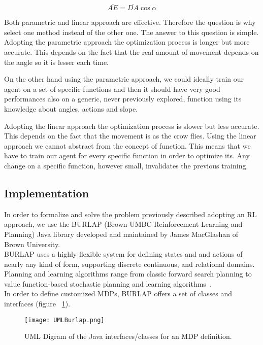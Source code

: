 \begin{equation}
	\overline{AE} = \overline{DA} \cos \alpha
\end{equation}

Both parametric and linear approach are effective. Therefore the question is why select one method instead of the other one. The answer to this question is simple. Adopting the parametric approach the optimization process is longer but more accurate. This depends on the fact that the real amount of movement depends on the angle so it is lesser each time. 

On the other hand using the parametric approach, we could ideally train our agent on a set of specific functions and then it should have very good performances also on a generic, never previously explored, function using its knowledge about angles, actions and slope. 

Adopting the linear approach the optimization process is slower but less accurate. This depends on the fact that the movement is as the crow flies. Using the linear approach we cannot abstract from the concept of function. This means that we have to train our agent for every specific function in order to optimize its. Any change on a specific function, however small, invalidates the previous training.

\subsection{Implementation}

In order to formalize and solve the problem previously described adopting an RL approach, we use the BURLAP (Brown-UMBC Reinforcement Learning and Planning) Java library developed and maintained by James MacGlashan of Brown University. \\

BURLAP uses a highly flexible system for defining states and and actions of nearly any kind of form, supporting discrete continuous, and relational domains. Planning and learning algorithms range from classic forward search planning to value function-based stochastic planning and learning algorithms~\cite{BURLAPSite}. \\

In order to define customized MDPs, BURLAP offers a set of classes and interfaces (figure ~\ref{fig:UMLBurlap}).

\begin{figure} [h!]
	\texttt{[image: UMLBurlap.png]}
	\caption{UML Digram of the Java interfaces/classes for an MDP definition.}
	\label{fig:UMLBurlap}
\end{figure}

